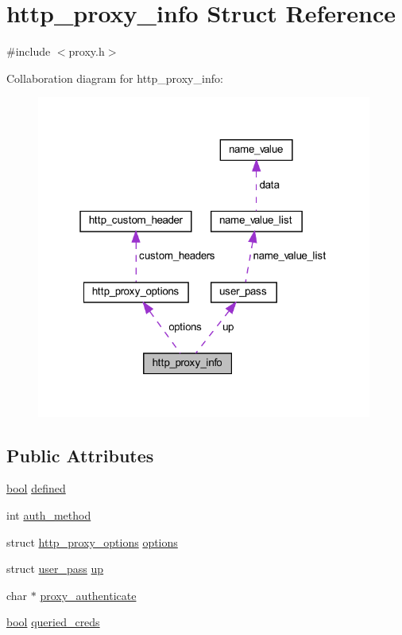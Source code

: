 \hypertarget{structhttp__proxy__info}{}\section{http\+\_\+proxy\+\_\+info Struct Reference}
\label{structhttp__proxy__info}


{\ttfamily \#include $<$proxy.\+h$>$}



Collaboration diagram for http\+\_\+proxy\+\_\+info\+:
\nopagebreak
\begin{figure}[H]
\begin{center}
\leavevmode
\includegraphics[width=313pt]{structhttp__proxy__info__coll__graph}
\end{center}
\end{figure}
\subsection*{Public Attributes}
\begin{DoxyCompactItemize}
\item 
\hyperlink{automatic_8c_abb452686968e48b67397da5f97445f5b}{bool} \hyperlink{structhttp__proxy__info_a3d9c07bca44f1fe1b06481e46e618742}{defined}
\item 
int \hyperlink{structhttp__proxy__info_ace0d81b0493e4857ea663108fc4e29d2}{auth\+\_\+method}
\item 
struct \hyperlink{structhttp__proxy__options}{http\+\_\+proxy\+\_\+options} \hyperlink{structhttp__proxy__info_aff84dc2217f3870663cf07fb1030bfc0}{options}
\item 
struct \hyperlink{structuser__pass}{user\+\_\+pass} \hyperlink{structhttp__proxy__info_a20a26493c51f97b4cc6f4ac687fca016}{up}
\item 
char $\ast$ \hyperlink{structhttp__proxy__info_afa05059793372786e98b9a5f914e6feb}{proxy\+\_\+authenticate}
\item 
\hyperlink{automatic_8c_abb452686968e48b67397da5f97445f5b}{bool} \hyperlink{structhttp__proxy__info_ae7c8574af511f9ccd61159a2efdebae5}{queried\+\_\+creds}
\end{DoxyCompactItemize}


